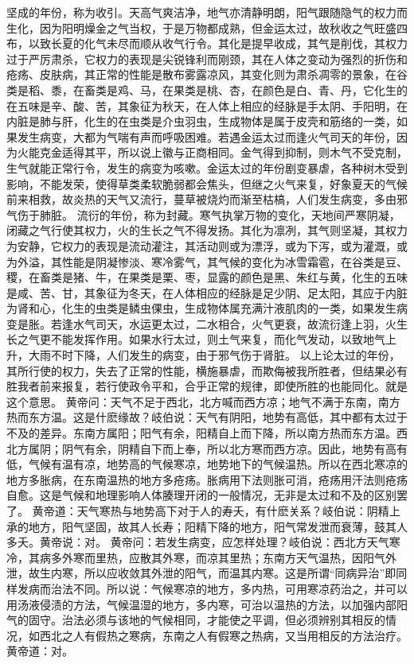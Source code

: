 \documentclass[a4paper,12pt,UTF8,twoside]{ctexbook}
\begin{document}
坚成的年份，称为收引。天高气爽洁净，地气亦清静明朗，阳气跟随隐气的权力而生化，因为阳明燥金之气当权，于是万物都成熟，但金运太过，故秋收之气旺盛四布，以致长夏的化气未尽而顺从收气行令。其化是提早收成，其气是削伐，其权力过于严厉肃杀，它权力的表现是尖锐锋利而刚颈，其在人体之变动为强烈的折伤和疮疡、皮肤病，其正常的性能是散布雾露凉风，其变化则为肃杀凋零的景象，在谷类是稻、黍，在畜类是鸡、马，在果类是桃、杏，在颜色是白、青、丹，它化生的在五味是辛、酸、苦，其象征为秋天，在人体上相应的经脉是手太阴、手阳明，在内脏是肺与肝，化生的在虫类是介虫羽虫，生成物体是属于皮壳和筋络的一类，如果发生病变，大都为气喘有声而呼吸困难。若遇金运太过而逢火气司天的年份，因为火能克金适得其平，所以说上徽与正商相同。金气得到抑制，则木气不受克制，生气就能正常行令，发生的病变为咳嗽。金运太过的年份剧变暴虐，各种树木受到影响，不能发荣，使得草类柔软脆弱都会焦头，但继之火气来复，好象夏天的气候前来相救，故炎热的天气又流行，蔓草被烧灼而渐至枯槁，人们发生病变，多由邪气伤于肺脏。
流衍的年份，称为封藏。寒气执掌万物的变化，天地间严寒阴凝，闭藏之气行使其权力，火的生长之气不得发扬。其化为凛冽，其气则坚凝，其权力为安静，它权力的表现是流动灌注，其活动则或为漂浮，或为下泻，或为灌溉，或为外溢，其性能是阴凝惨淡、寒冷雾气，其气候的变化为冰雪霜雹，在谷类是豆、稷，在畜类是猪、牛，在果类是栗、枣，显露的颜色是黑、朱红与黄，化生的五味是咸、苦、甘，其象征为冬天，在人体相应的经脉是足少阴、足太阳，其应于内脏为肾和心，化生的虫类是鳞虫倮虫，生成物体属充满汁液肌肉的一类，如果发生病变是胀。若逢水气司天，水运更太过，二水相合，火气更衰，故流衍逢上羽，火生长之气更不能发挥作用。如果水行太过，则土气来复，而化气发动，以致地气上升，大雨不时下降，人们发生的病变，由于邪气伤于肾脏。
以上论太过的年份，其所行使的权力，失去了正常的性能，横施暴虐，而欺侮被我所胜者，但结果必有胜我者前来报复，若行使政令平和，合乎正常的规律，即使所胜的也能同化。就是这个意思。
黄帝问：天气不足于西北，北方喊而西方凉；地气不满于东南，南方热而东方温。这是什麽缘故？岐伯说：天气有阴阳，地势有高低，其中都有太过于不及的差异。东南方属阳；阳气有余，阳精自上而下降，所以南方热而东方温。西北方属阴；阴气有余，阴精自下而上奉，所以北方寒而西方凉。因此，地势有高有低，气候有温有凉，地势高的气候寒凉，地势地下的气候温热。所以在西北寒凉的地方多胀病，在东南温热的地方多疮疡。胀病用下法则胀可消，疮疡用汗法则疮疡自愈。这是气候和地理影响人体腠理开闭的一般情况，无非是太过和不及的区别罢了。
黄帝道：天气寒热与地势高下对于人的寿夭，有什麽关系？岐伯说：阴精上承的地方，阳气坚固，故其人长寿；阳精下降的地方，阳气常发泄而衰薄，鼓其人多夭。黄帝说：对。
黄帝问：若发生病变，应怎样处理？岐伯说：西北方天气寒冷，其病多外寒而里热，应散其外寒，而凉其里热；东南方天气温热，因阳气外泄，故生内寒，所以应收敛其外泄的阳气，而温其内寒。这是所谓“同病异治”即同样发病而治法不同。所以说：气候寒凉的地方，多内热，可用寒凉药治之，并可以用汤液侵渍的方法，气候温湿的地方，多内寒，可治以温热的方法，以加强内部阳气的固守。治法必须与该地的气候相同，才能使之平调，但必须辨别其相反的情况，如西北之人有假热之寒病，东南之人有假寒之热病，又当用相反的方法治疗。黄帝道：对。
\end{document}
